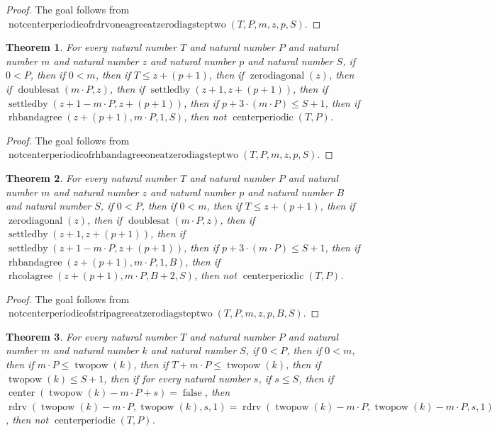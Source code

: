 \documentclass[11pt]{article}
\newtheorem{theorem}{Theorem}[section]
\theoremstyle{definition}
\begin{document}
\begin{proof}
The goal follows from \(\operatorname{notcenterperiodicofrdrvoneagreeatzerodiagsteptwo}(T, P, m, z, p, S)\).
\end{proof}
\begin{theorem}
\label{ll:paper:not-centerperiodic-of-rhbandagree-one-at-zero-diag-step-two}
For every natural number \(T\) and natural number \(P\) and natural number \(m\) and natural number \(z\) and natural number \(p\) and natural number \(S\), if \(0 < P\), then if \(0 < m\), then if \(T \le z + (p + 1)\), then if \(\operatorname{zerodiagonal}(z)\), then if \(\operatorname{doublesat}(m \cdot P, z)\), then if \(\operatorname{settledby}(z + 1, z + (p + 1))\), then if \(\operatorname{settledby}(z + 1 - m \cdot P, z + (p + 1))\), then if \(p + 3 \cdot (m \cdot P) \le S + 1\), then if \(\operatorname{rhbandagree}(z + (p + 1), m \cdot P, 1, S)\), then not \(\operatorname{centerperiodic}(T, P)\).
\end{theorem}
\begin{proof}
The goal follows from \(\operatorname{notcenterperiodicofrhbandagreeoneatzerodiagsteptwo}(T, P, m, z, p, S)\).
\end{proof}
\begin{theorem}
\label{ll:paper:not-centerperiodic-of-strip-agree-at-zero-diag-step-two}
For every natural number \(T\) and natural number \(P\) and natural number \(m\) and natural number \(z\) and natural number \(p\) and natural number \(B\) and natural number \(S\), if \(0 < P\), then if \(0 < m\), then if \(T \le z + (p + 1)\), then if \(\operatorname{zerodiagonal}(z)\), then if \(\operatorname{doublesat}(m \cdot P, z)\), then if \(\operatorname{settledby}(z + 1, z + (p + 1))\), then if \(\operatorname{settledby}(z + 1 - m \cdot P, z + (p + 1))\), then if \(p + 3 \cdot (m \cdot P) \le S + 1\), then if \(\operatorname{rhbandagree}(z + (p + 1), m \cdot P, 1, B)\), then if \(\operatorname{rhcolagree}(z + (p + 1), m \cdot P, B + 2, S)\), then not \(\operatorname{centerperiodic}(T, P)\).
\end{theorem}
\begin{proof}
The goal follows from \(\operatorname{notcenterperiodicofstripagreeatzerodiagsteptwo}(T, P, m, z, p, B, S)\).
\end{proof}
\begin{theorem}
\label{ll:paper:not-centerperiodic-of-rdrv-one-agree-sub-twopow-ge}
For every natural number \(T\) and natural number \(P\) and natural number \(m\) and natural number \(k\) and natural number \(S\), if \(0 < P\), then if \(0 < m\), then if \(m \cdot P \le \operatorname{twopow}(k)\), then if \(T + m \cdot P \le \operatorname{twopow}(k)\), then if \(\operatorname{twopow}(k) \le S + 1\), then if for every natural number \(s\), if \(s \le S\), then if \(\operatorname{center}(\operatorname{twopow}(k) - m \cdot P + s) = \operatorname{false}\), then \(\operatorname{rdrv}(\operatorname{twopow}(k) - m \cdot P, \operatorname{twopow}(k), s, 1) = \operatorname{rdrv}(\operatorname{twopow}(k) - m \cdot P, \operatorname{twopow}(k) - m \cdot P, s, 1)\), then not \(\operatorname{centerperiodic}(T, P)\).
\end{theorem}
\end{document}
